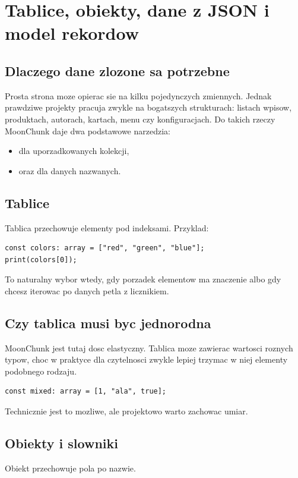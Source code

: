 \chapter{Tablice, obiekty, dane z JSON i model rekordow}

\section{Dlaczego dane zlozone sa potrzebne}
Prosta strona moze opierac sie na kilku pojedynczych zmiennych. Jednak prawdziwe projekty
pracuja zwykle na bogatszych strukturach: listach wpisow, produktach, autorach, kartach,
menu czy konfiguracjach. Do takich rzeczy MoonChunk daje dwa podstawowe narzedzia:

\begin{itemize}
  \item {} dla uporzadkowanych kolekcji,
  \item {} oraz  dla danych nazwanych.
\end{itemize}

\section{Tablice}
Tablica przechowuje elementy pod indeksami. Przyklad:

\begin{lstlisting}[style=moonchunk,caption={Prosta tablica}]
const colors: array = ["red", "green", "blue"];
print(colors[0]);
\end{lstlisting}

To naturalny wybor wtedy, gdy porzadek elementow ma znaczenie albo gdy chcesz iterowac
po danych petla z licznikiem.

\section{Czy tablica musi byc jednorodna}
MoonChunk jest tutaj dosc elastyczny. Tablica moze zawierac wartosci roznych typow,
choc w praktyce dla czytelnosci zwykle lepiej trzymac w niej elementy podobnego rodzaju.

\begin{lstlisting}[style=moonchunk,caption={Tablica mieszana}]
const mixed: array = [1, "ala", true];
\end{lstlisting}

Technicznie jest to mozliwe, ale projektowo warto zachowac umiar.

\section{Obiekty i slowniki}
Obiekt przechowuje pola po nazwie.

